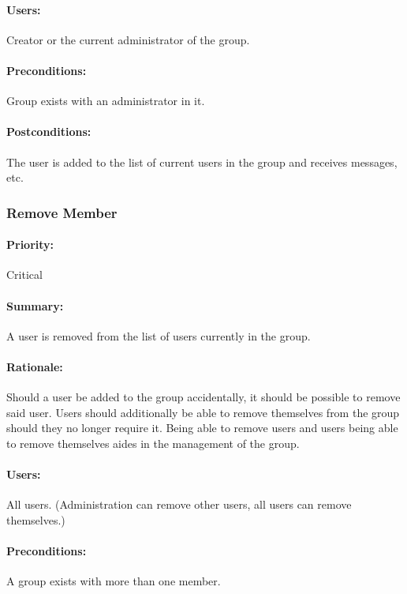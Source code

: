 \documentclass[11pt]{article}
\begin{document}
\paragraph{Users:}
Creator or the current administrator of the group.
\paragraph{Preconditions:}
Group exists with an administrator in it.
\paragraph{{Postconditions:}}
The user is added to the list of current users in the group and receives messages, etc.

\subsubsection{Remove Member} \label{UC-remove-member}
\paragraph{Priority:} Critical
\paragraph{Summary:}
A user is removed from the list of users currently in the group.
\paragraph{Rationale:}
Should a user be added to the group accidentally, it should be possible to remove said user. Users should additionally be able to remove themselves from the group should they no longer require it. Being able to remove users and users being able to remove themselves aides in the management of the group.
\paragraph{Users:}
All users. (Administration can remove other users, all users can remove themselves.)
\paragraph{Preconditions:}
A group exists with more than one member.
\end{document}
